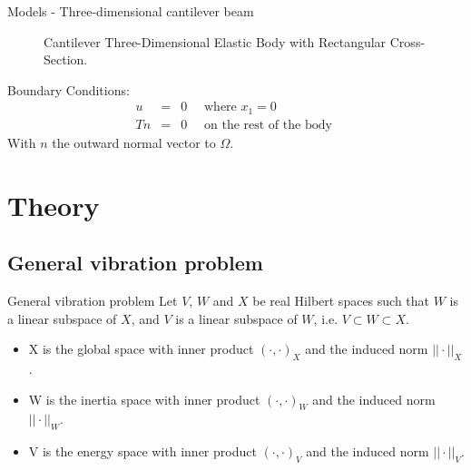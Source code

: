 \documentclass[8pt]{beamer}
\newcommand{\footfullcitenonumber}[1]{
  \footnotetext{\fullcite{#1}}
}
\begin{document}
\begin{frame}{Models - Three-dimensional cantilever beam}
\begin{figure}[h!]
\begin{tikzpicture}[scale=0.58]
                \end{tikzpicture}
                \caption{Cantilever Three-Dimensional Elastic Body with Rectangular Cross-Section.}
            \end{figure} 
            Boundary Conditions:
            \begin{eqnarray*}
                u & = & 0 \quad \textrm{ where } x_1 = 0\\
                Tn & = & 0 \quad \textrm{ on the rest of the body }
            \end{eqnarray*} With $n$ the outward normal vector to $\Omega$.
        \end{frame}

\section{Theory}
    \subsection{General vibration problem}
        \begin{frame}{General vibration problem}
            Let $V$, $W$ and $X$ be real Hilbert spaces such that $W$ is a linear subspace of $X$, and $V$ is a linear subspace of $W$, i.e. $V \subset W \subset X$.
            \begin{itemize}
                \item[] X is the global space with inner product $(\cdot,\cdot)_X$ and the induced norm $||\cdot||_X$.
                \item[] W is the inertia space with inner product $(\cdot,\cdot)_W$ and the induced norm $||\cdot||_W$.
                \item[] V is the energy space with inner product $(\cdot,\cdot)_V$ and the induced norm $||\cdot||_V$.
            \end{itemize}


            \footfullcitenonumber{VV02}
        \end{frame}
\end{document}
